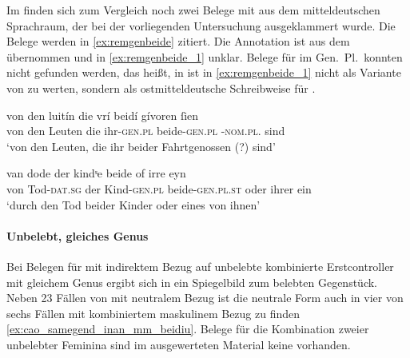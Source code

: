 Im \REM{} finden sich zum Vergleich noch zwei Belege mit  aus
dem mitteldeutschen Sprachraum, der bei der vorliegenden Untersuchung
ausgeklammert wurde. Die Belege werden in \cref{ex:remgenbeide} zitiert. Die
Annotation ist aus dem \REM{} übernommen und in \cref{ex:remgenbeide_1}
unklar. Belege für  im Gen.\ Pl.\ konnten nicht gefunden werden,
das heißt,  in  ist in \cref{ex:remgenbeide_1} nicht
als Variante von  zu werten, sondern als ostmitteldeutsche
Schreibweise für  \autocites[52--53]{paul2007}[305]{ksw2}.

\begin{exe}
\ex \label{ex:remgenbeide}
\begin{xlist}
	\ex \label{ex:remgenbeide_1}
		\gll von den luitín die vrí beidí gívoren ſien \\
			von den Leuten die ihr-\textsc{gen.pl} beide-\textsc{gen.pl}
			-\textsc{nom.pl.\MascA} sind
			\\
		\trans `von den Leuten, die ihr beider Fahrtgenossen (?) sind'
			\parencites(; Nordhausen, Stadtarchiv,
				Ms. II, Na 6%
				)[M320: 17v,21--22]{rem}

	\ex \label{ex:remgenbeide_2}
		\gll van dode der kindˢe beide of irre eyn \\
			von Tod-\textsc{dat.sg} der Kind-\textsc{gen.pl} beide-\textsc{gen.pl.st} oder
			ihrer ein \\
		\trans `durch den Tod beider Kinder oder eines von ihnen'
			\parencites(Köln, Historisches Archiv der Stadt, Best.~210 \mkbibparens{Domstift}, U~3/759)[M350: 5,11]{rem}
\end{xlist}
\end{exe}

\paragraph{Unbelebt, gleiches Genus}

Bei Belegen für  mit indirektem Bezug auf unbelebte kombinierte
Erstcontroller mit gleichem Genus ergibt sich in  ein
Spiegelbild zum belebten Gegenstück. Neben 23 Fällen von  mit
neutralem Bezug ist die neutrale Form auch in vier von sechs Fällen mit
kombiniertem maskulinem Bezug zu finden \cref{ex:cao_samegend_inan_mm_beidiu}.
Belege für die Kombination zweier unbelebter Feminina sind im ausgewerteten
Material keine vorhanden.

